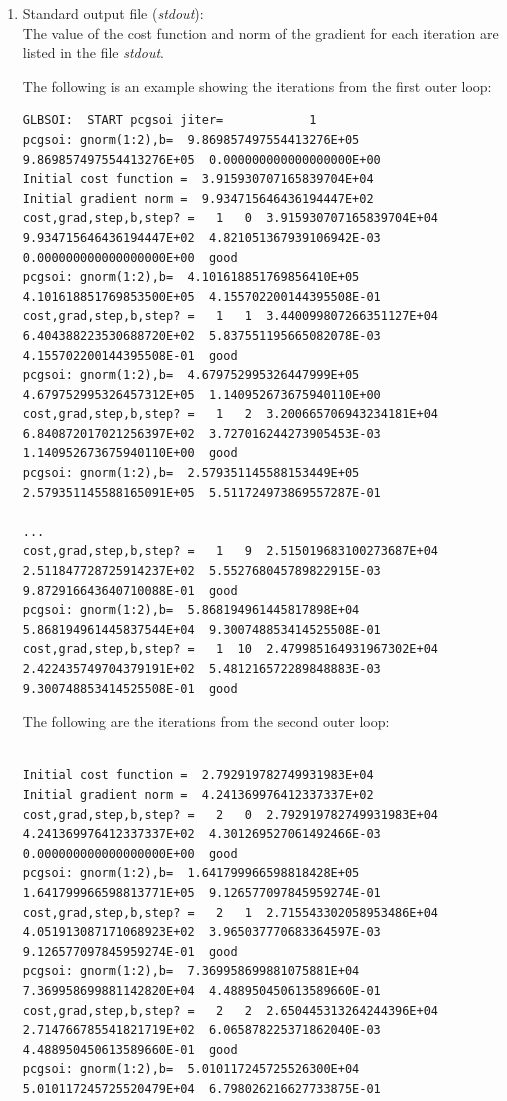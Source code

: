 \begin{enumerate}
\item Standard output file (\textit{stdout}):\\


The value of the cost function and norm of the gradient for each iteration are listed in the file \textit{stdout}. 

The following is an example showing the iterations from the first outer loop:

\begin{tiny}
\begin{verbatim}
GLBSOI:  START pcgsoi jiter=            1
pcgsoi: gnorm(1:2),b=  9.869857497554413276E+05  9.869857497554413276E+05  0.000000000000000000E+00
Initial cost function =  3.915930707165839704E+04
Initial gradient norm =  9.934715646436194447E+02
cost,grad,step,b,step? =   1   0  3.915930707165839704E+04  9.934715646436194447E+02  4.821051367939106942E-03  0.000000000000000000E+00  good
pcgsoi: gnorm(1:2),b=  4.101618851769856410E+05  4.101618851769853500E+05  4.155702200144395508E-01
cost,grad,step,b,step? =   1   1  3.440099807266351127E+04  6.404388223530688720E+02  5.837551195665082078E-03  4.155702200144395508E-01  good
pcgsoi: gnorm(1:2),b=  4.679752995326447999E+05  4.679752995326457312E+05  1.140952673675940110E+00
cost,grad,step,b,step? =   1   2  3.200665706943234181E+04  6.840872017021256397E+02  3.727016244273905453E-03  1.140952673675940110E+00  good
pcgsoi: gnorm(1:2),b=  2.579351145588153449E+05  2.579351145588165091E+05  5.511724973869557287E-01

...
cost,grad,step,b,step? =   1   9  2.515019683100273687E+04  2.511847728725914237E+02  5.552768045789822915E-03  9.872916643640710088E-01  good
pcgsoi: gnorm(1:2),b=  5.868194961445817898E+04  5.868194961445837544E+04  9.300748853414525508E-01
cost,grad,step,b,step? =   1  10  2.479985164931967302E+04  2.422435749704379191E+02  5.481216572289848883E-03  9.300748853414525508E-01  good

\end{verbatim}
\end{tiny}

The following are the iterations from the second outer loop:

\begin{tiny}
\begin{verbatim}

Initial cost function =  2.792919782749931983E+04
Initial gradient norm =  4.241369976412337337E+02
cost,grad,step,b,step? =   2   0  2.792919782749931983E+04  4.241369976412337337E+02  4.301269527061492466E-03  0.000000000000000000E+00  good
pcgsoi: gnorm(1:2),b=  1.641799966598818428E+05  1.641799966598813771E+05  9.126577097845959274E-01
cost,grad,step,b,step? =   2   1  2.715543302058953486E+04  4.051913087171068923E+02  3.965037770683364597E-03  9.126577097845959274E-01  good
pcgsoi: gnorm(1:2),b=  7.369958699881075881E+04  7.369958699881142820E+04  4.488950450613589660E-01
cost,grad,step,b,step? =   2   2  2.650445313264244396E+04  2.714766785541821719E+02  6.065878225371862040E-03  4.488950450613589660E-01  good
pcgsoi: gnorm(1:2),b=  5.010117245725526300E+04  5.010117245725520479E+04  6.798026216627733875E-01


\end{verbatim}
\end{tiny}
\end{enumerate}
